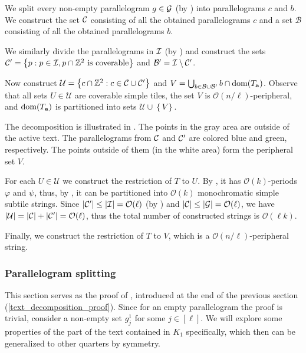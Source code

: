 \documentclass[11pt, letterpaper]{article}
\theoremstyle{plain}
\theoremstyle{definition}
\theoremstyle{remark}
\newcommand{\Z}{\mathbb{Z}}
\renewcommand{\O}{\mathcal{O}}
\newcommand{\U}{\mathcal{U}}
\renewcommand{\phi}{\varphi}
\newcommand{\set}[1]{\left\lbrace #1 \right\rbrace}
\begin{document}
\newcommand{\B}{\mathcal{B}}

We split every non-empty parallelogram $g \in \mathcal{G}$ (by ) into parallelograms $c$ and $b$.
We construct the set $\mathcal{C}$ consisting of all the obtained parallelograms $c$ and a set $\B$ consisting of all the obtained parallelograms $b$.

We similarly divide the parallelograms in $\mathcal{I}$ (by ) and construct the sets $\C' = \set{p : p \in \I, p \cap \Z^2 \text{ is coverable}}$ and $\B' = \I \setminus \C'$.

Now construct $\U = \set{c \cap \Z^2 : c \in \C \cup \C'}$ and $V = \bigcup_{b \in \B \cup \B'} b \cap \d{\Ta}$.
Observe that all sets $U \in \U$ are coverable simple tiles, the set $V$ is $\O(n / \ell)$-peripheral, and $\operatorname*{dom}(T_\mathbf{a})$ is partitioned into sets $\U \cup \set{V}$.

The decomposition is illustrated in .
The points in the gray area are outside of the active text.
The parallelograms from $\mathcal{C}$ and $\mathcal{C}'$ are colored blue and green, respectively.
The points outside of them (in the white area) form the peripheral set $V$.

For each $U \in \U$ we construct the restriction of $T$ to $U$.
By , it has $\O(k)$-periods $\phi$ and $\psi$, thus, by , it can be partitioned into $\O(k)$ monochromatic simple subtile strings.
Since $|\C'| \le |\I| = \O(\ell)$ (by ) and $|\C| \le |\G| = \O(\ell)$, we have $|\U| = |\C| + |\C'| = \O(\ell)$, thus the total number of constructed strings is $\O(\ell k)$.

Finally, we construct the restriction of $T$ to $V$, which is a $\O(n / \ell)$-peripheral string.


\subsubsection{Parallelogram splitting} \label{parallelogram_split_lemma_proof}

This section serves as the proof of , introduced at the end of the previous section (\ref{text_decomposition_proof}).
Since for an empty parallelogram the proof is trivial, consider a non-empty set $g^1_j$ for some $j \in [\ell]$.
We will explore some properties of the part of the text contained in $K_1$ specifically, which then can be generalized to other quarters by symmetry.
\end{document}
